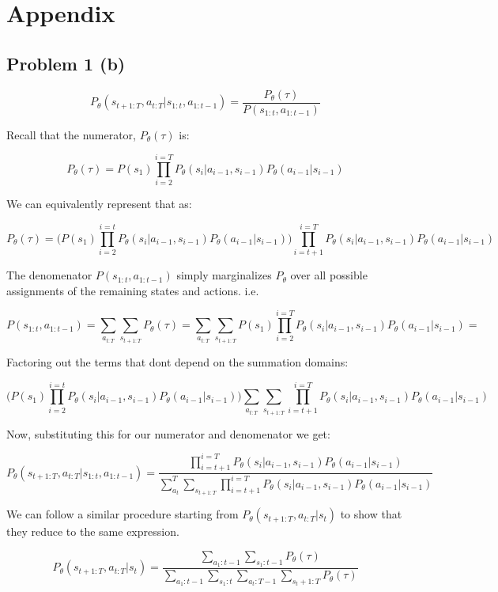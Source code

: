 \documentclass[a4paper]{article}
\begin{document}
\section*{Appendix}
\subsection*{Problem 1 (b)}

$$P_\theta(s_{t+1:T}, a_{t:T} | s_{1:t}, a_{1:t-1}) = \frac{P_\theta(\tau)}{P(s_{1:t}, a_{1:t-1})}$$

Recall that the numerator, $P_\theta(\tau)$ is:

$$P_\theta(\tau) = P(s_1)\prod_{i = 2}^{i = T}P_\theta(s_i|a_{i-1}, s_{i-1})P_\theta(a_{i-1}|s_{i-1})$$

We can equivalently represent that as:

$$P_\theta(\tau) = \Bigg( P(s_1)\prod_{i = 2}^{i = t}P_\theta(s_i|a_{i-1}, s_{i-1})P_\theta(a_{i-1}|s_{i-1}) \Bigg) \prod_{i = t+1}^{i = T}P_\theta(s_i|a_{i-1}, s_{i-1})P_\theta(a_{i-1}|s_{i-1})$$

The denomenator $P(s_{1:t}, a_{1:t-1})$ simply marginalizes $P_\theta$ over all possible assignments of the remaining states and actions. i.e.

$$P(s_{1:t}, a_{1:t-1}) = \sum_{a_{t:T}}\sum_{s_{t+1:T}} P_\theta(\tau) = \sum_{a_{t:T}}\sum_{s_{t+1:T}} P(s_1)\prod_{i = 2}^{i = T}P_\theta(s_i|a_{i-1}, s_{i-1})P_\theta(a_{i-1}|s_{i-1}) = $$

Factoring out the terms that dont depend on the summation domains:

$$ \Bigg(P(s_1)\prod_{i = 2}^{i = t}P_\theta(s_i|a_{i-1}, s_{i-1})P_\theta(a_{i-1}|s_{i-1}) \Bigg) \sum_{a_{t:T}}\sum_{s_{t+1:T}} \prod_{i = t+1}^{i = T}P_\theta(s_i|a_{i-1}, s_{i-1})P_\theta(a_{i-1}|s_{i-1})$$


Now, substituting this for our numerator and denomenator we get:

$$P_\theta(s_{t+1:T}, a_{t:T} | s_{1:t}, a_{1:t-1}) = \frac{ \prod_{i = t+1}^{i = T}P_\theta(s_i|a_{i-1}, s_{i-1})P_\theta(a_{i-1}|s_{i-1})}{ \sum_{a_t}^T\sum_{s_{t+1:T}} \prod_{i = t+1}^{i = T}P_\theta(s_i|a_{i-1}, s_{i-1})P_\theta(a_{i-1}|s_{i-1})}$$

We can follow a similar procedure starting from $P_\theta(s_{t+1:T}, a_{t:T} | s_t)$ to show that they reduce to the same expression. 


 $$P_\theta(s_{t+1:T}, a_{t:T} | s_t) = \frac{\sum_{a_1:t-1}\sum_{s_1:t-1} P_\theta(\tau)}{\sum_{a_1:t-1}\sum_{s_1:t} \sum_{a_t:T-1}\sum_{s_t+1:T} P_\theta(\tau)}$$
 
\end{document}
